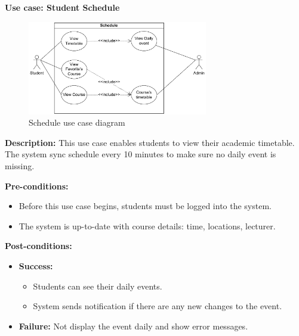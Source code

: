 \documentclass[12pt]{article}
\begin{document}
\textbf{Use case: Student Schedule} \\

    \begin{figure}[H]
        \centering
        \includegraphics[width=0.7\textwidth]{image/StudentScheduleUseCase.pdf} 
        \caption{Schedule use case diagram}
        \label{fig:schedule_use_case}
    \end{figure}
    \textbf{Description:} This use case enables students to view their academic timetable. The system sync schedule every 10 minutes to make sure no daily event is missing. \\

    \pagebreak

    \noindent \textbf{Pre-conditions:} 
        \begin{itemize}
            \item Before this use case begins, students must be logged into the system.
            \item The system is up-to-date with course details: time, locations, lecturer.
        \end{itemize}

    \noindent \textbf{Post-conditions:}
    \begin{itemize}
        \item \textbf{Success:} 
        \begin{itemize}
            \item Students can see their daily events.
            \item System sends notification if there are any new changes to the event.
        \end{itemize}
        \item \textbf{Failure:} Not display the event daily and show error messages.
    \end{itemize}
\end{document}
